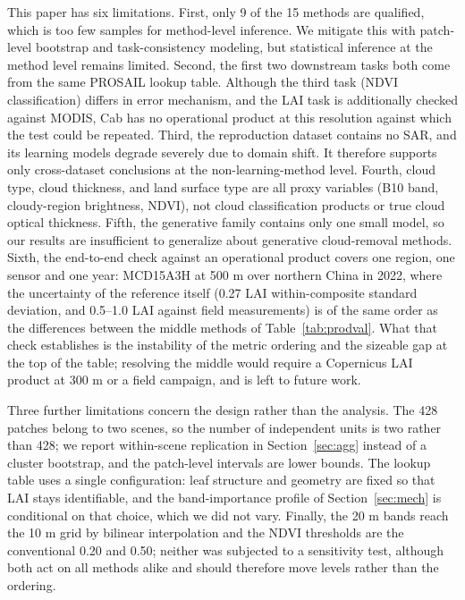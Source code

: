 \documentclass[a4paper,fleqn]{cas-dc}
\begin{document}
This paper has six limitations. First, only 9 of the 15 methods are qualified, which is too few samples for method-level inference. We mitigate this with patch-level bootstrap and task-consistency modeling, but statistical inference at the method level remains limited. Second, the first two downstream tasks both come from the same PROSAIL lookup table. Although the third task (NDVI classification) differs in error mechanism, and the LAI task is additionally checked against MODIS, Cab has no operational product at this resolution against which the test could be repeated. Third, the reproduction dataset contains no SAR, and its learning models degrade severely due to domain shift. It therefore supports only cross-dataset conclusions at the non-learning-method level. Fourth, cloud type, cloud thickness, and land surface type are all proxy variables (B10 band, cloudy-region brightness, NDVI), not cloud classification products or true cloud optical thickness. Fifth, the generative family contains only one small model, so our results are insufficient to generalize about generative cloud-removal methods. Sixth, the end-to-end check against an operational product covers one region, one sensor and one year: MCD15A3H at 500 m over northern China in 2022, where the uncertainty of the reference itself (0.27 LAI within-composite standard deviation, and 0.5--1.0 LAI against field measurements) is of the same order as the differences between the middle methods of Table~\ref{tab:prodval}. What that check establishes is the instability of the metric ordering and the sizeable gap at the top of the table; resolving the middle would require a Copernicus LAI product at 300 m or a field campaign, and is left to future work.

Three further limitations concern the design rather than the analysis. The 428 patches belong to two scenes, so the number of independent units is two rather than 428; we report within-scene replication in Section~\ref{sec:agg} instead of a cluster bootstrap, and the patch-level intervals are lower bounds. The lookup table uses a single configuration: leaf structure and geometry are fixed so that LAI stays identifiable, and the band-importance profile of Section~\ref{sec:mech} is conditional on that choice, which we did not vary. Finally, the 20 m bands reach the 10 m grid by bilinear interpolation and the NDVI thresholds are the conventional 0.20 and 0.50; neither was subjected to a sensitivity test, although both act on all methods alike and should therefore move levels rather than the ordering.
\end{document}
